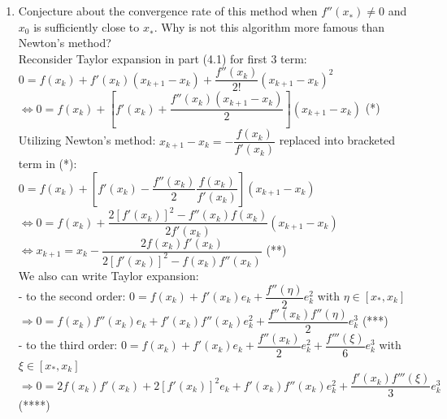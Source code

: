 \documentclass[14pt,a4paper]{article}
\begin{document}
\begin{enumerate}
	\label{4g}
	\item Conjecture about the convergence rate of this method when $f''(x_∗) \neq 0$ and $x_0$ is sufficiently close to $x_∗$. Why is not this algorithm more famous than Newton’s method?\\
	Reconsider Taylor expansion in part (4.1) for first 3 term:\\
	\hspace*{2cm}	$ 0 = f(x_k) + f'(x_k)(x_{k+1}-x_k) + \dfrac{f''(x_k)}{2!}(x_{k+1} - x_k)^2$\\
	\hspace*{1.5cm}	$\Leftrightarrow 0 = f(x_k) + \left[f'(x_k) + \dfrac{f''(x_k)(x_{k+1} -x_k)}{2}\right](x_{k+1} - x_k)$	 	\hspace{2cm} (*)\\
	Utilizing Newton's method: $x_{k+1}-x_k = -\dfrac{f(x_k)}{f'(x_k)}$ replaced into bracketed term in (*):\\
	\hspace*{2cm}	$ 0 = f(x_k) + \left[f'(x_k) - \dfrac{f''(x_k)}{2}\dfrac{f(x_k)}{f'(x_k)}\right](x_{k+1} - x_k)$\\
	\hspace*{1.5cm}	$\Leftrightarrow 0 = f(x_k) + \dfrac{2[f'(x_k)]^2 -f''(x_k)f(x_k)}{2f'(x_k)}(x_{k+1} - x_k)$\\
	\hspace*{1.5cm}	$\Leftrightarrow x_{k+1} = x_k - \dfrac{2f(x_k)f'(x_k)}{2[f'(x_k)]^2 - f(x_k)f''(x_k)}$  \hspace{5cm} (**)\\
	We also can write Taylor expansion:\\
	- to the second order: $0 = f(x_k) + f'(x_k)e_k + \dfrac{f''(\eta)}{2}e_k^2$ \hspace{2cm} with $\eta \in [x_*,x_k]$\\
	\hspace*{1cm} $\Rightarrow 0 = f(x_k)f''(x_k)e_k + f'(x_k)f''(x_k)e_k^2 + \dfrac{f''(x_k)f''(\eta)}{2}e_k^3$ \hspace{2cm} (***)\\
	- to the third order: $0 = f(x_k) + f'(x_k)e_k + \dfrac{f''(x_k)}{2}e_k^2 + \dfrac{f'''(\xi)}{6}e_k^3$ \hspace{1cm}  with $\xi \in [x_*,x_k]$\\
	\hspace*{1cm} $\Rightarrow 0 = 2f(x_k)f'(x_k) + 2[f'(x_k)]^2e_k + f'(x_k)f''(x_k)e_k^2 + \dfrac{f'(x_k)f'''(\xi)}{3}e_k^3$ \hspace{1cm}  (****)\\

\end{enumerate}
\end{document}
